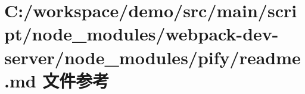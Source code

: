\hypertarget{node__modules_2webpack-dev-server_2node__modules_2pify_2_r_e_a_d_m_e_8md}{}\section{C\+:/workspace/demo/src/main/script/node\+\_\+modules/webpack-\/dev-\/server/node\+\_\+modules/pify/readme.md 文件参考}
\label{node__modules_2webpack-dev-server_2node__modules_2pify_2_r_e_a_d_m_e_8md}
